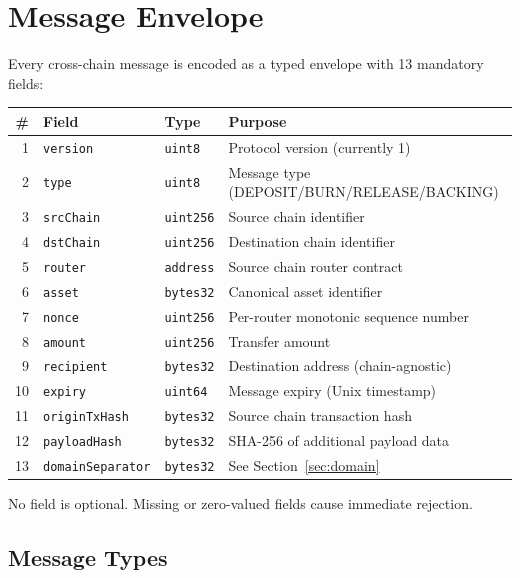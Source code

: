 \documentclass[11pt,a4paper]{article}
\begin{document}
\section{Message Envelope}

Every cross-chain message is encoded as a typed envelope with 13 mandatory fields:

\begin{center}
\begin{tabular}{rlll}
\toprule
\textbf{\#} & \textbf{Field} & \textbf{Type} & \textbf{Purpose} \\
\midrule
1 & \texttt{version} & \texttt{uint8} & Protocol version (currently 1) \\
2 & \texttt{type} & \texttt{uint8} & Message type (DEPOSIT/BURN/RELEASE/BACKING) \\
3 & \texttt{srcChain} & \texttt{uint256} & Source chain identifier \\
4 & \texttt{dstChain} & \texttt{uint256} & Destination chain identifier \\
5 & \texttt{router} & \texttt{address} & Source chain router contract \\
6 & \texttt{asset} & \texttt{bytes32} & Canonical asset identifier \\
7 & \texttt{nonce} & \texttt{uint256} & Per-router monotonic sequence number \\
8 & \texttt{amount} & \texttt{uint256} & Transfer amount \\
9 & \texttt{recipient} & \texttt{bytes32} & Destination address (chain-agnostic) \\
10 & \texttt{expiry} & \texttt{uint64} & Message expiry (Unix timestamp) \\
11 & \texttt{originTxHash} & \texttt{bytes32} & Source chain transaction hash \\
12 & \texttt{payloadHash} & \texttt{bytes32} & SHA-256 of additional payload data \\
13 & \texttt{domainSeparator} & \texttt{bytes32} & See Section~\ref{sec:domain} \\
\bottomrule
\end{tabular}
\end{center}

No field is optional. Missing or zero-valued fields cause immediate rejection.

\subsection{Message Types}
\end{document}
